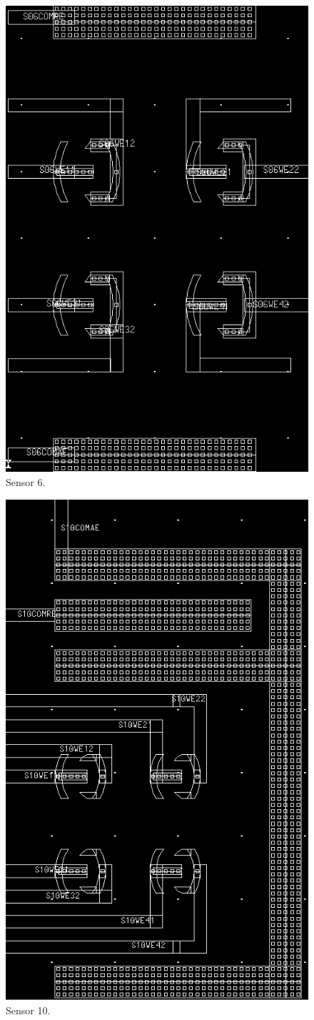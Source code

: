 \begin{figure}
	\centering
	\includegraphics[width=0.7\linewidth]{figures/s06.png}
	\caption{Sensor 6.}
	\label{s06}
\end{figure}

\begin{figure}
	\centering
	\includegraphics[width=0.7\linewidth]{figures/s10.png}
	\caption{Sensor 10.}
	\label{s10}
\end{figure}

